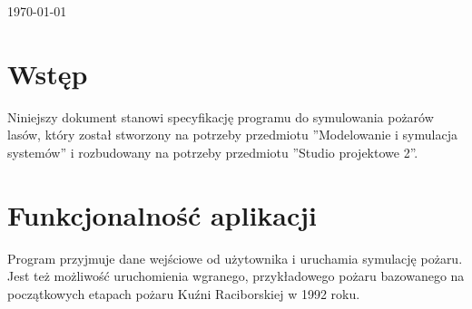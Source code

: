 \documentclass[a4paper, 11pt]{article}
\begin{document}
\begin{titlepage}
		
		
		{\large \today}\\[3cm] %
		
		
		
		
		\vfill %
		
	\end{titlepage}
	
	
	\vfill
	\newpage
	
	
	
	\section{Wstęp}
	\indent
	
	Niniejszy dokument stanowi specyfikację programu do symulowania pożarów lasów, który został stworzony na potrzeby przedmiotu ''Modelowanie i symulacja systemów'' i rozbudowany na potrzeby przedmiotu ''Studio projektowe 2''.
	
	\section{Funkcjonalność aplikacji}
	\indent
	
	Program przyjmuje dane wejściowe od użytownika i uruchamia symulację pożaru. Jest też możliwość uruchomienia wgranego, przykładowego pożaru bazowanego na początkowych etapach pożaru Kuźni Raciborskiej w 1992 roku. \\
	
\end{document}
